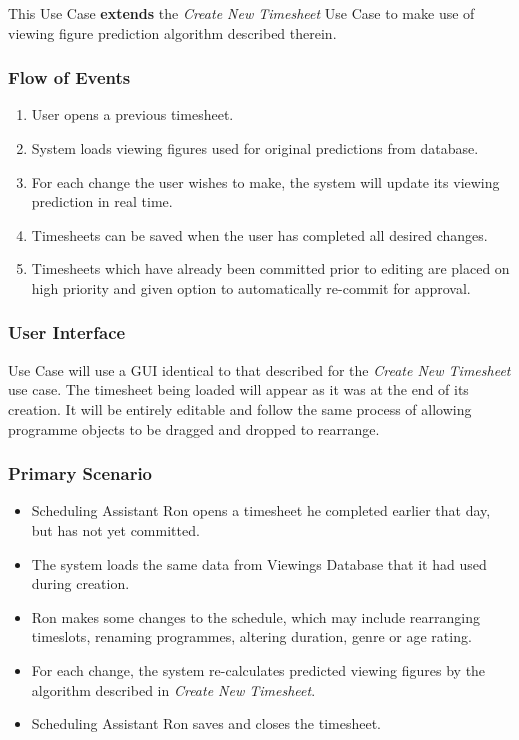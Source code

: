 \documentclass[11pt, oneside]{article}
\begin{document}
This Use Case \textbf{extends} the \textit{Create New Timesheet} Use Case to make use of viewing figure prediction algorithm described therein.
\subsubsection*{Flow of Events}
\begin{enumerate}
\item User opens a previous timesheet.
\item System loads viewing figures used for original predictions from database.
\item For each change the user wishes to make, the system will update its viewing prediction in real time.
\item Timesheets can be saved when the user has completed all desired changes.
\item Timesheets which have already been committed prior to editing are placed on high priority and given option to automatically re-commit for approval.
\end{enumerate}
\subsubsection*{User Interface}
Use Case will use a GUI identical to that described for the \textit{Create New Timesheet} use case. The timesheet being loaded will appear as it was at the end of its creation. It will be entirely editable and follow the same process of allowing programme objects to be dragged and dropped to rearrange.
\subsubsection*{Primary Scenario}
\begin{itemize}
\renewcommand\labelitemi{--}
 \item Scheduling Assistant Ron opens a timesheet he completed earlier that day, but has not yet committed.
 \item The system loads the same data from Viewings Database that it had used during creation.
 \item Ron makes some changes to the schedule, which may include rearranging timeslots, renaming programmes, altering duration, genre or age rating.
 \item For each change, the system re-calculates predicted viewing figures by the algorithm described in \textit{Create New Timesheet}.
 \item Scheduling Assistant Ron saves and closes the timesheet.
 \end{itemize}
\end{document}
